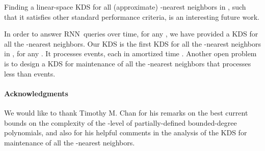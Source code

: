 \documentclass[preprint,12pt]{elsarticle}
\def\rknn{\mbox{RNN}}
\begin{document}
Finding a linear-space KDS for all (approximate) -nearest neighbors in , such that it satisfies other standard performance criteria, is an interesting future work.

In order to answer \rknn~queries over time, for any , we have provided a KDS for all the -nearest neighbors. Our KDS is the first KDS for all the -nearest neighbors in , for any . It processes  events, each in amortized time . Another open problem is to design a KDS for maintenance of all the -nearest neighbors that processes less than  events.




\paragraph{\textbf{Acknowledgments}} We would like to thank Timothy M. Chan for his remarks on the best current bounds on the complexity of the -level of partially-defined bounded-degree polynomials, and also for his helpful comments in the analysis of the KDS for maintenance of all the -nearest neighbors.


\end{document}
